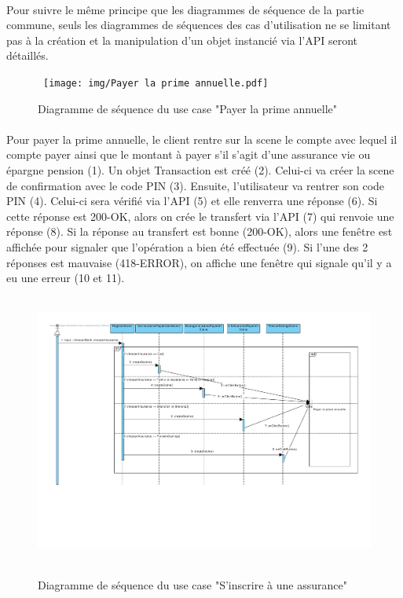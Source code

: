 \documentclass[]{article}
\begin{document}
\paragraph{}Pour suivre le même principe que les diagrammes de séquence de la partie commune, seuls les diagrammes de séquences des cas d’utilisation ne se limitant pas à la création et la manipulation d’un objet instancié via l’API seront détaillés.

\begin{figure}[h!]
\hbox{
    \centering\texttt{[image: img/Payer la prime annuelle.pdf]}
}
\caption{Diagramme de séquence du use case "Payer la prime annuelle"}
\end{figure}

\paragraph{} Pour payer la prime annuelle, le client rentre sur la scene le compte avec lequel il compte payer ainsi que le montant à payer s’il s’agit d’une assurance vie ou épargne pension (1). Un objet Transaction est créé (2). Celui-ci va créer la scene de confirmation avec le code PIN (3). Ensuite, l’utilisateur va rentrer son code PIN (4). Celui-ci sera vérifié via l’API (5) et elle renverra une réponse (6). Si cette réponse est 200-OK, alors on crée le transfert via l’API (7) qui renvoie une réponse (8). Si la réponse au transfert est bonne (200-OK), alors une fenêtre est affichée pour signaler que l’opération a bien été effectuée (9). Si l’une des 2 réponses est mauvaise (418-ERROR), on affiche une fenêtre qui signale qu’il y a eu une erreur (10 et 11).

\newpage

\begin{figure}[h!]
    \hbox{
        \centering\includegraphics[width=\linewidth]{img/S'inscrire à une assurance.pdf}
    }
    \caption{Diagramme de séquence du use case "S'inscrire à une assurance"}
    \end{figure}
\end{document}
